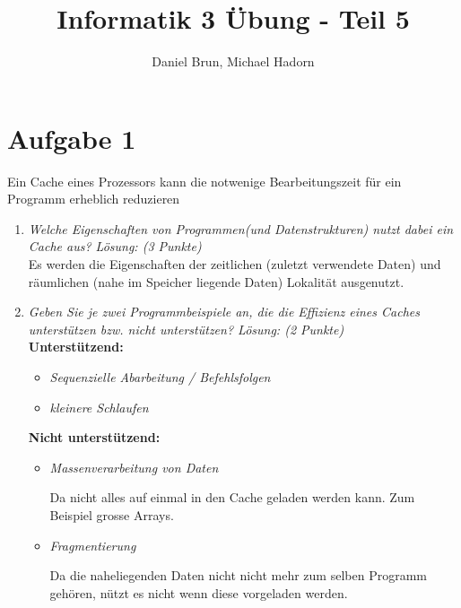 \documentclass[10pt]{article}
\title{Informatik 3 Übung - Teil 5\vspace{-2ex}}
\author{Daniel Brun, Michael Hadorn\vspace{-2ex}}
\begin{document}
\maketitle

\section*{Aufgabe 1}
Ein Cache eines Prozessors kann die notwenige Bearbeitungszeit für ein Programm erheblich reduzieren
\begin{enumerate}[label=\alph*)]
	\item
		\textit{Welche Eigenschaften von Programmen(und Datenstrukturen) nutzt dabei ein Cache aus? Lösung: (3 Punkte)}\\
		Es werden die Eigenschaften der zeitlichen (zuletzt verwendete Daten) und räumlichen (nahe im Speicher liegende Daten) Lokalität ausgenutzt.
		
		\item 
		\textit{Geben Sie je zwei Programmbeispiele an, die die Effizienz eines Caches unterstützen bzw. nicht unterstützen? Lösung: (2 Punkte)}\\
		\textbf{Unterstützend:}
		\begin{itemize}
			\item \textit{Sequenzielle Abarbeitung / Befehlsfolgen }
			\item \textit{kleinere Schlaufen}
		\end{itemize}
		
		\textbf{Nicht unterstützend:}
		\begin{itemize}
			\item \textit{Massenverarbeitung von Daten}
			
			Da nicht alles auf einmal in den Cache geladen werden kann. Zum Beispiel grosse Arrays.
			
			\item \textit{Fragmentierung}
			
			Da die naheliegenden Daten nicht nicht mehr zum selben Programm gehören, nützt es nicht wenn diese vorgeladen werden.
			
		\end{itemize}
\end{enumerate}
\end{document}
